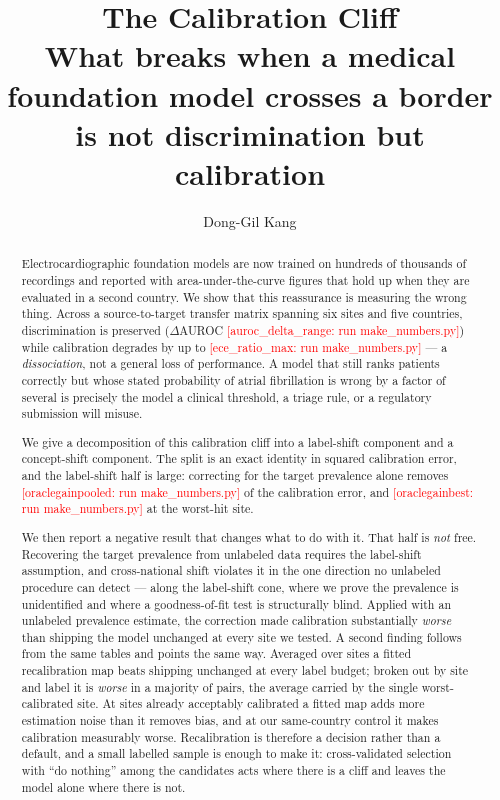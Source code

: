 \documentclass[11pt]{article}
\title{\textbf{The Calibration Cliff}\\[2pt]
\large What breaks when a medical foundation model crosses a border\\
is not discrimination but calibration}
\author[1]{Dong-Gil Kang}
\affil[1]{Pusan National University}
\date{}
\theoremstyle{plain}
\theoremstyle{definition}
\theoremstyle{remark}
\providecommand{\NUM}[1]{\textcolor{red}{[#1: run make\_numbers.py]}}}
\begin{document}
\maketitle

\begin{abstract}
\noindent
Electrocardiographic foundation models are now trained on hundreds of thousands
of recordings and reported with area-under-the-curve figures that hold up when
they are evaluated in a second country.  We show that this reassurance is
measuring the wrong thing.  Across a source-to-target transfer matrix spanning
six sites and five countries, discrimination is preserved
(\(\Delta\)AUROC \NUM{auroc\_delta\_range}) while calibration degrades by up to
\NUM{ece\_ratio\_max} --- a \emph{dissociation}, not a general loss of
performance.  A model that still ranks patients correctly but whose stated
probability of atrial fibrillation is wrong by a factor of several is
precisely the model a clinical threshold, a triage rule, or a regulatory
submission will misuse.

We give a decomposition of this calibration cliff into a label-shift component
and a concept-shift component.  The split is an exact identity in squared
calibration error, and the label-shift half is large: correcting for the target
prevalence alone removes \NUM{oraclegainpooled} of the calibration error, and
\NUM{oraclegainbest} at the worst-hit site.

We then report a negative result that changes what to do with it.  That half is
\emph{not} free.  Recovering the target prevalence from unlabeled data requires
the label-shift assumption, and cross-national shift violates it in the one
direction no unlabeled procedure can detect --- along the label-shift cone,
where we prove the prevalence is unidentified and where a goodness-of-fit test
is structurally blind.  Applied with an unlabeled prevalence estimate, the
correction made calibration substantially \emph{worse} than shipping the model
unchanged at every site we tested.  A second finding follows from the same tables and points the same way.  Averaged
over sites a fitted recalibration map beats shipping unchanged at every label
budget; broken out by site and label it is \emph{worse} in a majority of pairs,
the average carried by the single worst-calibrated site.  At sites already
acceptably calibrated a fitted map adds more estimation noise than it removes
bias, and at our same-country control it makes calibration measurably worse.
Recalibration is therefore a decision rather than a default, and a small
labelled sample is enough to make it: cross-validated selection with ``do
nothing'' among the candidates acts where there is a cliff and leaves the model
alone where there is not.


\end{abstract}
\end{document}
